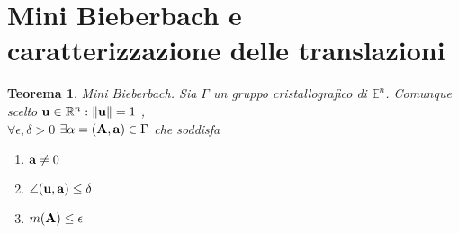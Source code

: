 \documentclass[a4paper,11pt,openright,twoside	]{book}
\newtheorem{theorem}{Teorema}[section]
\begin{document}
\section{Mini Bieberbach e caratterizzazione delle translazioni} 
\begin{theorem}{Mini Bieberbach.} 
\label{teo:minibieb}
Sia $\Gamma$ un gruppo cristallografico di $\mathbb{E}^n$. Comunque scelto $ \vb{u} \in \mathbb{R}^n : \norm{\vb{u}} = 1$ ,\\
$  \forall \epsilon ,\delta >0 $ $   \exists \alpha = \vb{(A,a)} \in \Gamma $ che soddisfa 
\begin{enumerate}
\item $\vb{a} \neq 0$ 
\item $ \angle (\vb{u, a}) \leq \delta $
\item $ m(\vb{A}) \leq \epsilon$ 
\end{enumerate}
\end{theorem}
\end{document}
